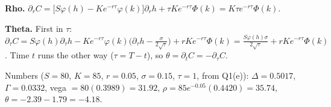 \begin{problem}[Q5]
\begin{steps}
\item \textbf{Rho.} $\partial_rC=\big[S\varphi(h)-Ke^{-r\tau}\varphi(k)\big]\partial_rh+\tau Ke^{-r\tau}\Phi(k)=K\tau e^{-r\tau}\Phi(k)$.
\item \textbf{Theta.} First in $\tau$: $\partial_\tau C=S\varphi(h)\partial_\tau h-Ke^{-r\tau}\varphi(k)\big(\partial_\tau h-\frac\sigma{2\sqrt\tau}\big)+rKe^{-r\tau}\Phi(k)=\frac{S\varphi(h)\sigma}{2\sqrt\tau}+rKe^{-r\tau}\Phi(k)$. Time $t$ runs the other way ($\tau=T-t$), so $\theta=\partial_tC=-\partial_\tau C$.
\item Numbers ($S=80$, $K=85$, $r=0.05$, $\sigma=0.15$, $\tau=1$, from Q1(e)): $\Delta=0.5017$, $\Gamma=0.0332$, vega $=80(0.3989)=31.92$, $\rho=85e^{-0.05}(0.4420)=35.74$, $\theta=-2.39-1.79=-4.18$.
\end{steps}
\end{problem}

